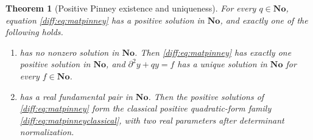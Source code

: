 \documentclass[11pt,letterpaper]{article}
\numberwithin{equation}{section}
\newtheorem{theorem}{Theorem}[section]
\theoremstyle{definition}
\theoremstyle{remark}
\newcommand{\No}{\mathbf{No}}
\newcommand{\der}{\partial}
\begin{document}
\begin{theorem}[Positive Pinney existence and uniqueness]
\label{diff:thm:matpinney}
For every $q\in\No$, equation \cref{diff:eq:matpinney} has a positive solution
in $\No$, and exactly one of the following holds.
\begin{enumerate}[label=\textup{(\roman*)},leftmargin=2.4em]
\item {} has no nonzero solution in $\No$. Then
\cref{diff:eq:matpinney} has \emph{exactly one} positive solution in $\No$,
and $\der^{2}y+qy=f$ has a unique solution in $\No$ for every $f\in\No$.
\item {} has a real fundamental pair in $\No$. Then the
positive solutions of \cref{diff:eq:matpinney} form the classical positive
quadratic-form family \cref{diff:eq:matpinneyclassical}, with two real
parameters after determinant normalization.
\end{enumerate}
\end{theorem}
\end{document}
